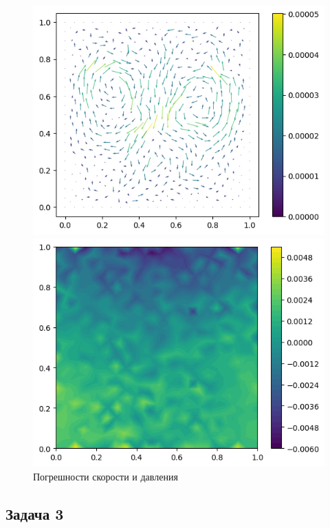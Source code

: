 \documentclass[a4paper,10pt]{report}
\begin{document}
\begin{figure}[H]
    \begin{minipage}{0.49\linewidth}
        \includegraphics[height=0.75\linewidth]{lucasflow/eu.png}
    \end{minipage}
    \begin{minipage}{0.49\linewidth}
        \includegraphics[height=0.75\linewidth]{lucasflow/ep.png}
    \end{minipage}
    \label{fig:lucasflow-error}
    \caption{Погрешности скорости и давления}
\end{figure}

\subsection{Задача 3}
\end{document}
